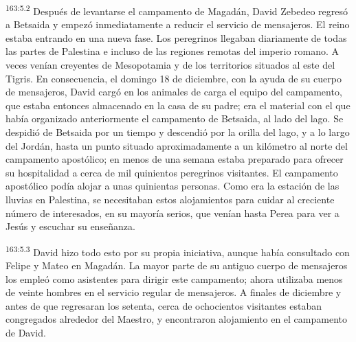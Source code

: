 \par
\textsuperscript{163:5.2} Después de levantarse el campamento de Magadán, David Zebedeo regresó a Betsaida y empezó inmediatamente a reducir el servicio de mensajeros. El reino estaba entrando en una nueva fase. Los peregrinos llegaban diariamente de todas las partes de Palestina e incluso de las regiones remotas del imperio romano. A veces venían creyentes de Mesopotamia y de los territorios situados al este del Tigris. En consecuencia, el domingo 18 de diciembre, con la ayuda de su cuerpo de mensajeros, David cargó en los animales de carga el equipo del campamento, que estaba entonces almacenado en la casa de su padre; era el material con el que había organizado anteriormente el campamento de Betsaida, al lado del lago. Se despidió de Betsaida por un tiempo y descendió por la orilla del lago, y a lo largo del Jordán, hasta un punto situado aproximadamente a un kilómetro al norte del campamento apostólico; en menos de una semana estaba preparado para ofrecer su hospitalidad a cerca de mil quinientos peregrinos visitantes. El campamento apostólico podía alojar a unas quinientas personas. Como era la estación de las lluvias en Palestina, se necesitaban estos alojamientos para cuidar al creciente número de interesados, en su mayoría serios, que venían hasta Perea para ver a Jesús y escuchar su enseñanza.

\par
\textsuperscript{163:5.3} David hizo todo esto por su propia iniciativa, aunque había consultado con Felipe y Mateo en Magadán. La mayor parte de su antiguo cuerpo de mensajeros los empleó como asistentes para dirigir este campamento; ahora utilizaba menos de veinte hombres en el servicio regular de mensajeros. A finales de diciembre y antes de que regresaran los setenta, cerca de ochocientos visitantes estaban congregados alrededor del Maestro, y encontraron alojamiento en el campamento de David.

